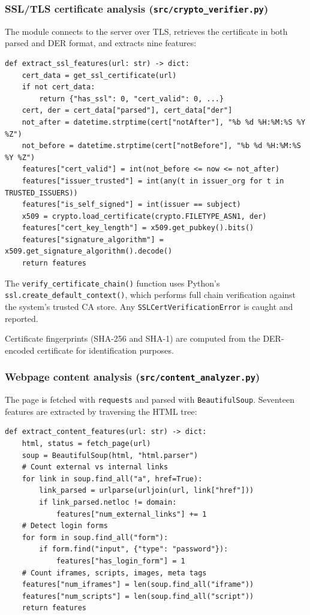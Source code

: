 \documentclass[11pt,a4paper]{article}
\begin{document}
\subsubsection*{SSL/TLS certificate analysis (\texttt{src/crypto\_verifier.py})}

The module connects to the server over TLS, retrieves the certificate in both parsed and DER format, and extracts nine features:

\begin{lstlisting}
def extract_ssl_features(url: str) -> dict:
    cert_data = get_ssl_certificate(url)
    if not cert_data:
        return {"has_ssl": 0, "cert_valid": 0, ...}
    cert, der = cert_data["parsed"], cert_data["der"]
    not_after = datetime.strptime(cert["notAfter"], "%b %d %H:%M:%S %Y %Z")
    not_before = datetime.strptime(cert["notBefore"], "%b %d %H:%M:%S %Y %Z")
    features["cert_valid"] = int(not_before <= now <= not_after)
    features["issuer_trusted"] = int(any(t in issuer_org for t in TRUSTED_ISSUERS))
    features["is_self_signed"] = int(issuer == subject)
    x509 = crypto.load_certificate(crypto.FILETYPE_ASN1, der)
    features["cert_key_length"] = x509.get_pubkey().bits()
    features["signature_algorithm"] = x509.get_signature_algorithm().decode()
    return features
\end{lstlisting}

The \texttt{verify\_certificate\_chain()} function uses Python's \texttt{ssl.create\_default\_context()}, which performs full chain verification against the system's trusted CA store. Any \texttt{SSLCertVerificationError} is caught and reported.

Certificate fingerprints (SHA-256 and SHA-1) are computed from the DER-encoded certificate for identification purposes.

\subsubsection*{Webpage content analysis (\texttt{src/content\_analyzer.py})}

The page is fetched with \texttt{requests} and parsed with \texttt{BeautifulSoup}. Seventeen features are extracted by traversing the HTML tree:

\begin{lstlisting}
def extract_content_features(url: str) -> dict:
    html, status = fetch_page(url)
    soup = BeautifulSoup(html, "html.parser")
    # Count external vs internal links
    for link in soup.find_all("a", href=True):
        link_parsed = urlparse(urljoin(url, link["href"]))
        if link_parsed.netloc != domain:
            features["num_external_links"] += 1
    # Detect login forms
    for form in soup.find_all("form"):
        if form.find("input", {"type": "password"}):
            features["has_login_form"] = 1
    # Count iframes, scripts, images, meta tags
    features["num_iframes"] = len(soup.find_all("iframe"))
    features["num_scripts"] = len(soup.find_all("script"))
    return features
\end{lstlisting}
\end{document}
